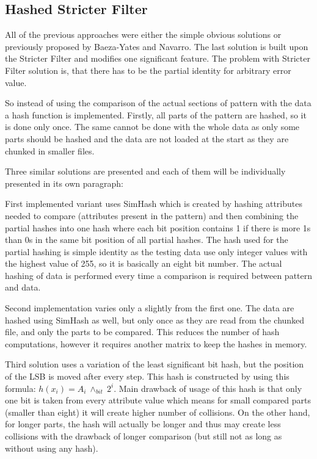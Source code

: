 \subsection{Hashed Stricter Filter }
All of the previous approaches were either the simple obvious solutions or previously proposed by Baeza-Yates and Navarro. The last solution is built upon the Stricter Filter and modifies one significant feature. The problem with Stricter Filter solution is, that there has to be the partial identity for arbitrary error value.

So instead of using the comparison of the actual sections of pattern with the data a hash function is implemented. Firstly, all parts of the pattern are hashed, so it is done only once. The same cannot be done with the whole data as only some parts should be hashed and the data are not loaded at the start as they are chunked in smaller files.

Three similar solutions are presented and each of them will be individually presented in its own paragraph:

First implemented variant uses SimHash which is created by hashing attributes needed to compare (attributes present in the pattern) and then combining the partial hashes into one hash where each bit position contains 1 if there is more 1s than 0s in the same bit position of all partial hashes. The hash used for the partial hashing is simple identity as the testing data use only integer values with the highest value of 255, so it is  basically an eight bit number. The actual hashing of data is performed every time a comparison is required between pattern and data.

Second implementation varies only a slightly from the first one. The data are hashed using SimHash as well, but only once as they are read from the chunked file, and only the parts to be compared. This reduces the number of hash computations, however it requires another matrix to keep the hashes in memory.

Third solution uses a variation of the least significant bit hash, but the position of the LSB is moved after every step. This hash is constructed by using this formula: $h(x_i) = A_i\ \land_{bit}\ 2^i$. Main drawback of usage of this hash is that only one bit is taken from every attribute value which means for small compared parts (smaller than eight) it will create higher number of collisions. On the other hand, for longer parts, the hash will actually be longer and thus may create less collisions with the drawback of longer comparison (but still not as long as without using any hash).

